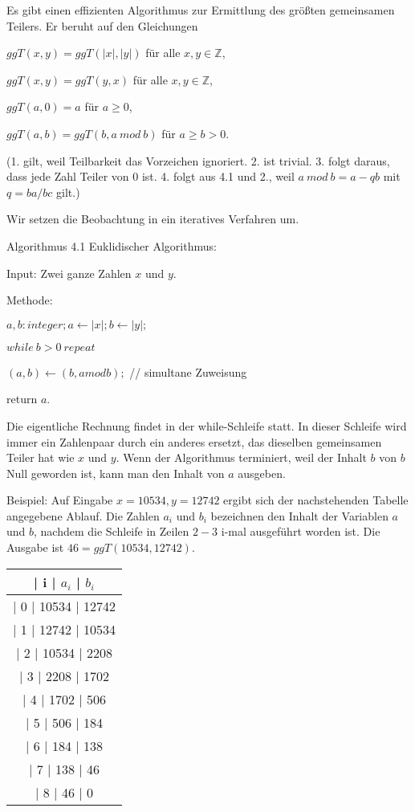 \documentclass[a4paper]{article}
\begin{document}
\begin{multicols}{3}
    Es gibt einen effizienten Algorithmus zur Ermittlung des größten gemeinsamen Teilers. Er beruht auf den Gleichungen
    \begin{enumerate*}
        \item $ggT(x,y) = ggT(|x|,|y|)$ für alle $x,y\in\mathbb{Z}$,
        \item $ggT(x,y) = ggT(y,x)$ für alle $x,y\in\mathbb{Z}$,
        \item $ggT(a,0) =a$ für $a\geq 0$,
        \item $ggT(a,b) = ggT(b,a\ mod\ b)$ für $a\geq b >0$.
    \end{enumerate*}

    (1. gilt, weil Teilbarkeit das Vorzeichen ignoriert. 2. ist trivial. 3. folgt daraus, dass jede Zahl Teiler von $0$ ist. 4. folgt aus 4.1 und 2., weil $a\ mod\ b=a-qb$ mit $q=ba/bc$ gilt.)

    Wir setzen die Beobachtung in ein iteratives Verfahren um.

    Algorithmus 4.1 Euklidischer Algorithmus:
    \begin{itemize*}
        \item Input: Zwei ganze Zahlen $x$ und $y$.
        \item Methode:
        \begin{enumerate*}
            \item $a,b:integer;a\leftarrow |x|;b\leftarrow |y|;$
            \item $while\ b> 0\ repeat$
            \item $(a,b)\leftarrow (b,amodb);$ // simultane Zuweisung
            \item return $a$.
        \end{enumerate*}
    \end{itemize*}

    Die eigentliche Rechnung findet in der while-Schleife statt. In dieser Schleife wird immer ein Zahlenpaar durch ein anderes ersetzt, das dieselben gemeinsamen Teiler hat wie $x$ und $y$. Wenn der Algorithmus terminiert, weil der Inhalt $b$ von $b$ Null geworden ist, kann man den Inhalt von $a$ ausgeben.

    Beispiel: Auf Eingabe $x=10534, y=12742$ ergibt sich der nachstehenden Tabelle angegebene Ablauf. Die Zahlen $a_i$ und $b_i$ bezeichnen den Inhalt der Variablen $a$ und $b$, nachdem die Schleife in Zeilen $2-3$ i-mal ausgeführt worden ist. Die Ausgabe ist $46 = ggT(10534,12742)$.
    \begin{tabular}{c}
        | i  | $a_i$ | $b_i$ \\\hline
        | 0  | 10534 | 12742 \\
        | 1  | 12742 | 10534 \\
        | 2  | 10534 | 2208  \\
        | 3  | 2208 | 1702   \\
        | 4  | 1702 | 506    \\
        | 5  | 506  | 184    \\
        | 6  | 184  | 138    \\
        | 7  | 138  | 46     \\
        | 8  | 46  | 0
    \end{tabular}



\end{multicols}
\end{document}
